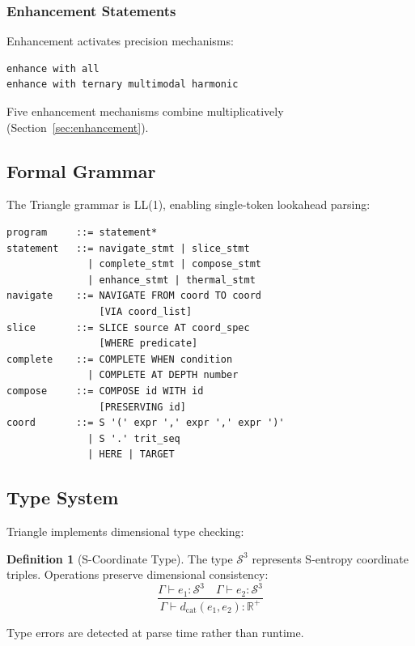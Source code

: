\documentclass[10pt,twocolumn]{article}
\theoremstyle{definition}
\newtheorem{definition}[theorem]{Definition}
\theoremstyle{remark}
\begin{document}
\subsubsection{Enhancement Statements}

Enhancement activates precision mechanisms:
\begin{lstlisting}
enhance with all
enhance with ternary multimodal harmonic
\end{lstlisting}

Five enhancement mechanisms combine multiplicatively (Section~\ref{sec:enhancement}).

\subsection{Formal Grammar}

The Triangle grammar is LL(1), enabling single-token lookahead parsing:

\begin{verbatim}
program     ::= statement*
statement   ::= navigate_stmt | slice_stmt
              | complete_stmt | compose_stmt
              | enhance_stmt | thermal_stmt
navigate    ::= NAVIGATE FROM coord TO coord
                [VIA coord_list]
slice       ::= SLICE source AT coord_spec
                [WHERE predicate]
complete    ::= COMPLETE WHEN condition
              | COMPLETE AT DEPTH number
compose     ::= COMPOSE id WITH id
                [PRESERVING id]
coord       ::= S '(' expr ',' expr ',' expr ')'
              | S '.' trit_seq
              | HERE | TARGET
\end{verbatim}

\subsection{Type System}

Triangle implements dimensional type checking:

\begin{definition}[S-Coordinate Type]
The type $\mathcal{S}^3$ represents S-entropy coordinate triples. Operations preserve dimensional consistency:
\begin{equation}
\frac{\Gamma \vdash e_1 : \mathcal{S}^3 \quad \Gamma \vdash e_2 : \mathcal{S}^3}{\Gamma \vdash d_{\text{cat}}(e_1, e_2) : \mathbb{R}^+}
\end{equation}
\end{definition}

Type errors are detected at parse time rather than runtime.
\end{document}
